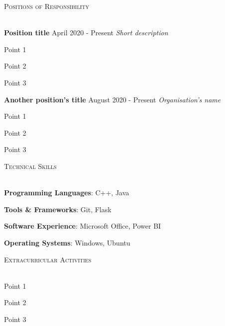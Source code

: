 \documentclass[12pt]{article}   %
\renewcommand{\section}[1]{
    \textsc{#1}
    \vspace*{-10pt} \\ \hspace*{-5pt} 
    \hrulefill \\
    \vspace*{-15pt}
}
\newcommand{\smallbullet}{
    \small$\bullet$
}
\newenvironment{spaced-bullet-list-major}{
    \begin{list}{
        \smallbullet
    }{
        \setlength\leftmargin{15pt}\topsep 0pt
    }
} {
    \end{list}
}
\newcommand{\bigblock}[3]{
    {
        \hspace*{5pt} \textbf{#1} \hfill #2 \newline
        \hspace*{5pt} \textit{#3}
    }
}
\newenvironment{bullet-list-minor}{
    \begin{list}{
        \smallbullet
    }{
        \setlength\leftmargin{30pt}\topsep 0pt \itemsep -3pt
    }
} {
    \end{list}
}
\begin{document}

    \section{Positions of Responsibility}

    \bigblock{
        Position title
    }{
        April 2020 - Present
    }{
        Short description
    }
    \begin{bullet-list-minor}
        \item Point 1
        \item Point 2
        \item Point 3
    \end{bullet-list-minor}
    

    \bigblock{
        Another position's title
    }{
        August 2020 - Present
    }{
        Organisation's name
    }
	\begin{bullet-list-minor}
        \item Point 1
        \item Point 2
        \item Point 3
    \end{bullet-list-minor}


    \section{Technical Skills}

    \begin{spaced-bullet-list-major}
        \item \textbf{Programming Languages}: C++, Java
        \item \textbf{Tools \& Frameworks}: Git, Flask
        \item \textbf{Software Experience}: Microsoft Office, Power BI
        \item \textbf{Operating Systems}: Windows, Ubuntu
    \end{spaced-bullet-list-major} 


    \section{Extracurricular Activities}

    \begin{spaced-bullet-list-major}
        \item Point 1
        \item Point 2
        \item Point 3
    \end{spaced-bullet-list-major}


    \vspace*{-7.71mm}
\end{document}

